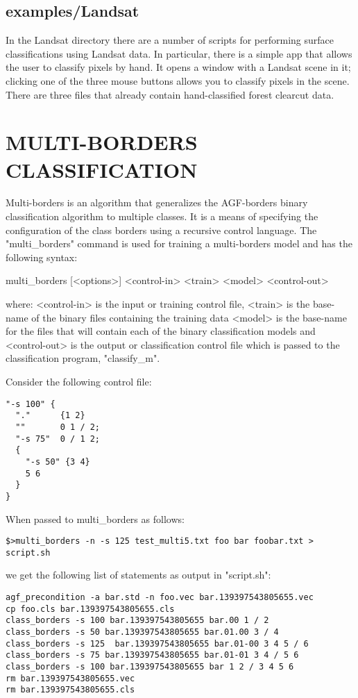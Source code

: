 \documentclass[12pt]{article}
\begin{document}
\subsection{examples/Landsat}

In the Landsat directory there are a number of scripts for performing surface classifications using Landsat data.  In particular, there is a simple app that allows the user to classify pixels by hand.  It opens a window with a Landsat scene in it; clicking one of the three mouse buttons allows you to classify pixels in the scene.  There are three files that already contain hand-classified forest clearcut data.


\section{MULTI-BORDERS CLASSIFICATION}

  Multi-borders is an algorithm that generalizes the AGF-borders binary classification algorithm to multiple classes.  It is a means of specifying the configuration of the class borders using a recursive control language.  The "multi_borders" command is used for training a multi-borders model and has the following syntax:

  multi_borders [<options>] <control-in> <train> <model> <control-out>

where: 
  <control-in> is the input or training control file, 
  <train> is the base-name of the binary files containing the training data
  <model> is the base-name for the files that will contain each of the binary classification models and 
  <control-out> is the output or classification control file which is passed to the classification program, "classify_m".  

Consider the following control file:

\begin{verbatim}
"-s 100" {
  "."      {1 2}
  ""       0 1 / 2;
  "-s 75"  0 / 1 2;
  {
    "-s 50" {3 4}
    5 6
  } 
}
\end{verbatim}

When passed to multi_borders as follows:

\begin{verbatim}
$>multi_borders -n -s 125 test_multi5.txt foo bar foobar.txt > script.sh
\end{verbatim}

we get the following list of statements as output in "script.sh":

\begin{verbatim}
agf_precondition -a bar.std -n foo.vec bar.139397543805655.vec
cp foo.cls bar.139397543805655.cls
class_borders -s 100 bar.139397543805655 bar.00 1 / 2
class_borders -s 50 bar.139397543805655 bar.01.00 3 / 4
class_borders -s 125  bar.139397543805655 bar.01-00 3 4 5 / 6
class_borders -s 75 bar.139397543805655 bar.01-01 3 4 / 5 6
class_borders -s 100 bar.139397543805655 bar 1 2 / 3 4 5 6
rm bar.139397543805655.vec
rm bar.139397543805655.cls
\end{verbatim}
\end{document}
